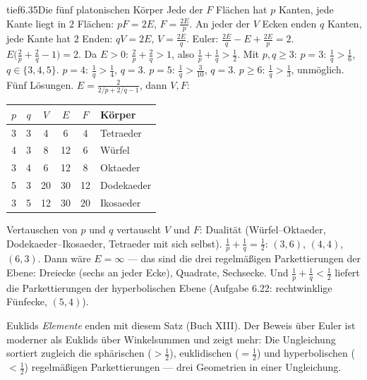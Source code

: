 \begin{loesungkarte}{tief}{6.35}{Die fünf platonischen Körper}
Jede der $F$ Flächen hat $p$ Kanten, jede Kante liegt in $2$ Flächen: $pF = 2E$, $F = \frac{2E}p$. An jeder der $V$ Ecken enden $q$ Kanten, jede Kante hat $2$ Enden: $qV = 2E$, $V = \frac{2E}q$. Euler: $\frac{2E}q - E + \frac{2E}p = 2$.
$E\bigl(\frac2p + \frac2q - 1\bigr) = 2$. Da $E > 0$: $\frac2p + \frac2q > 1$, also $\frac1p + \frac1q > \frac12$. Mit $p, q\ge3$: $p = 3$: $\frac1q > \frac16$, $q\in\{3, 4, 5\}$. $p = 4$: $\frac1q > \frac14$, $q = 3$. $p = 5$: $\frac1q > \frac3{10}$, $q = 3$. $p\ge6$: $\frac1q > \frac13$, unmöglich. Fünf Lösungen.
$E = \frac2{2/p + 2/q - 1}$, dann $V, F$:
\begin{center}\small
\begin{tabular}{cc|ccc|l}
$p$ & $q$ & $V$ & $E$ & $F$ & Körper\\ \hline
3 & 3 & 4 & 6 & 4 & Tetraeder\\
4 & 3 & 8 & 12 & 6 & Würfel\\
3 & 4 & 6 & 12 & 8 & Oktaeder\\
5 & 3 & 20 & 30 & 12 & Dodekaeder\\
3 & 5 & 12 & 30 & 20 & Ikosaeder
\end{tabular}
\end{center}
Vertauschen von $p$ und $q$ vertauscht $V$ und $F$: Dualität (Würfel--Oktaeder, Dodekaeder--Ikosaeder, Tetraeder mit sich selbst).
$\frac1p + \frac1q = \frac12$: $(3, 6)$, $(4, 4)$, $(6, 3)$. Dann wäre $E = \infty$ --- das sind die drei regelmäßigen Parkettierungen der Ebene: Dreiecke (sechs an jeder Ecke), Quadrate, Sechsecke. Und $\frac1p + \frac1q < \frac12$ liefert die Parkettierungen der hyperbolischen Ebene (Aufgabe 6.22: rechtwinklige Fünfecke, $(5, 4)$).
\begin{mitnehmen}\kastentext
Euklids \emph{Elemente} enden mit diesem Satz (Buch XIII). Der Beweis über Euler ist moderner als Euklids über Winkelsummen und zeigt mehr: Die Ungleichung sortiert zugleich die sphärischen ($> \frac12$), euklidischen ($= \frac12$) und hyperbolischen ($< \frac12$) regelmäßigen Parkettierungen --- drei Geometrien in einer Ungleichung.
\end{mitnehmen}
\end{loesungkarte}

